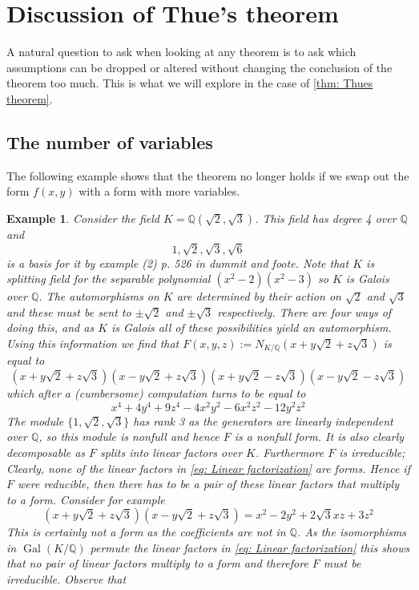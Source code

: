 \documentclass{article}
\DeclareMathOperator{\Gal}{Gal}
\newtheorem{example}{Example}[section]
\newcommand{\mbb}[1]{\mathbb{#1}}
\begin{document}
\section*{Discussion of Thue's theorem}
A natural question to ask when looking at any theorem is to ask which assumptions can be dropped or altered without changing the conclusion of the theorem too much. This is what we will explore in the case of \cref{thm: Thues theorem}. 
\subsection*{The number of variables}
The following example shows that the theorem no longer holds if we swap out the form $f(x, y)$ with a form with more variables. 

\begin{example}
Consider the field $K = \mbb Q(\sqrt 2, \sqrt 3)$. This field has degree 4 over $\mbb Q$ and $$1, \sqrt 2, \sqrt 3, \sqrt 6$$ is a basis for it by example (2) p. 526 in dummit and foote. Note that $K$ is splitting field for the separable polynomial $(x^2 - 2)(x^2 - 3)$ so $K$ is Galois over $\mbb Q$. The automorphisms on $K$ are determined by their action on $\sqrt 2$ and $\sqrt 3$ and these must be sent to $\pm \sqrt 2$ and $\pm \sqrt 3$ respectively. There are four ways of doing this, and as $K$ is Galois all of these possibilities yield an automorphism. Using this information we find that $F(x,y,z) := N_{K /\mbb Q}(x + y\sqrt 2 + z \sqrt 3)$ is equal to
\begin{equation}\label{eq: Linear factorization}
    (x + y\sqrt 2 + z \sqrt 3)(x - y\sqrt 2 + z \sqrt 3)(x + y\sqrt 2 - z \sqrt 3)(x - y\sqrt 2 - z \sqrt 3)
\end{equation}
which after a (cumbersome) computation turns to be equal to  
$$x^4 + 4y^4 + 9z^4 - 4x^2y^2 - 6x^2z^2 - 12y^2z^2$$
The module $\{1, \sqrt 2, \sqrt 3\}$ has rank 3 as the generators are linearly independent over $\mbb Q$, so this module is nonfull and hence $F$ is a nonfull form. It is also clearly decomposable as $F$ splits into linear factors over $K$. Furthermore $F$ is irreducible; Clearly, none of the linear factors in \cref{eq: Linear factorization} are forms. Hence if $F$ were reducible, then there has to be a pair of these linear factors that multiply to a form. Consider for example
$$(x + y\sqrt 2 + z \sqrt 3)(x - y\sqrt 2 + z \sqrt 3) = x^2 - 2 y^2 + 2 \sqrt 3 x z + 3 z^2$$
This is certainly not a form as the coefficients are not in $\mbb Q$. As the isomorphisms in $\Gal(K / \mbb Q)$ permute the linear factors in \cref{eq: Linear factorization} this shows that no pair of linear factors multiply to a form and therefore $F$ must be irreducible. Observe that 

\end{example}
\end{document}
